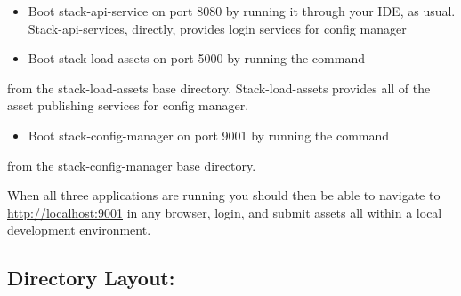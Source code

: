 \begin{itemize}
\tightlist
\item
  Boot stack-api-service on port 8080 by running it through your IDE, as
  usual. Stack-api-services, directly, provides login services for
  config manager
\item
  Boot stack-load-assets on port 5000 by running the command
\end{itemize}

\begin{Shaded}
\begin{Highlighting}[]
\end{Highlighting}
\end{Shaded}

from the stack-load-assets base directory. Stack-load-assets provides
all of the asset publishing services for config manager.

\begin{itemize}
\tightlist
\item
  Boot stack-config-manager on port 9001 by running the command
\end{itemize}

\begin{Shaded}
\begin{Highlighting}[]
\end{Highlighting}
\end{Shaded}

from the stack-config-manager base directory.

When all three applications are running you should then be able to
navigate to \href{http://localhost:9001}{http://localhost:9001} in any
browser, login, and submit assets all within a local development
environment.

\hypertarget{directory-layout}{%
\subsection{Directory Layout:}\label{directory-layout}}


